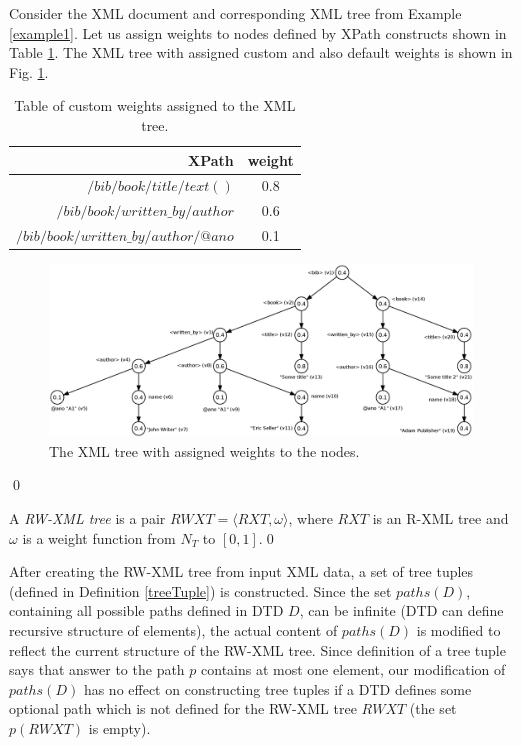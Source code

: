 \begin{example}
Consider the XML document and corresponding XML tree from Example \ref{example1}. Let us assign weights to nodes defined by XPath constructs shown in Table \ref{weightTab}. The XML tree with assigned custom and also default weights is shown in Fig. \ref{weightsFig}.

\begin{table}[h]
\begin{tabular}{r | c}
XPath & weight\\\hline
$/bib/book/title/text()$ & 0.8\\
$/bib/book/written\_by/author$ & 0.6\\
$/bib/book/written\_by/author/@ano$ & 0.1\\
\end{tabular}
\caption{Table of custom weights assigned to the XML tree.}
\label{weightTab}
\end{table}

\begin{figure}[H]
    \centering\includegraphics[width=\textwidth]{weights}
	\caption{The XML tree with assigned weights to the nodes.} \label{weightsFig}
\end{figure}
\qed
\end{example}


\begin{define}
A {\sl RW-XML tree} is a pair $RWXT = \langle RXT, \omega \rangle$, where $RXT$ is an R-XML tree and $\omega$ is a weight function from $N_T$ to $[0,1]$.\qed
\end{define}

After creating the RW-XML tree from input XML data, a set of tree tuples (defined in Definition \ref{treeTuple}) is constructed. Since the set $paths(D)$, containing all possible paths defined in DTD $D$, can be infinite (DTD can define recursive structure of elements), the actual content of $paths(D)$ is modified to reflect the current structure of the RW-XML tree. Since definition of a tree tuple says that answer to the path $p$ contains at most one element, our modification of $paths(D)$ has no effect on constructing tree tuples if a DTD defines some optional path which is not defined for the RW-XML tree $RWXT$ (the set $p(RWXT)$ is empty).

